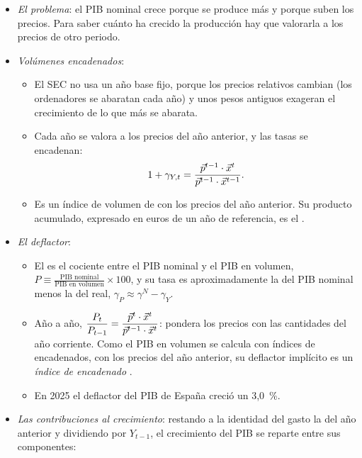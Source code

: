 \documentclass[11pt]{article}
\begin{document}
\begin{itemize}
\item \emph{El problema}: el PIB nominal crece porque se produce más y porque suben los precios. Para saber cuánto ha crecido la producción hay que valorarla a los precios de otro periodo.
\item \emph{Volúmenes encadenados}:
  \begin{itemize}
  \item El SEC no usa un año base fijo, porque los precios relativos cambian (los ordenadores se abaratan cada año) y unos pesos antiguos exageran el crecimiento de lo que más se abarata.
  \item Cada año se valora a los precios del año anterior, y las tasas se encadenan\nocite{SEC2010}:
\begin{equation}\label{eq:volumen-encadenado}
1+\gamma_{Y,t}=\frac{\vec{p}^{t-1}\cdot\vec{x}^{t}}{\vec{p}^{t-1}\cdot\vec{x}^{t-1}} .
\end{equation}
  \item Es un índice de volumen de  con los precios del año anterior. Su producto acumulado, expresado en euros de un año de referencia, es el .
  \end{itemize}
\item \emph{El deflactor}:
  \begin{itemize}
  \item El  es el cociente entre el PIB nominal y el PIB en volumen, $P\equiv\frac{\text{PIB nominal}}{\text{PIB en volumen}}\times100$, y su tasa es aproximadamente la del PIB nominal menos la del real, $\gamma_P\approx\gamma^N-\gamma_Y$.
  \item Año a año, $\dfrac{P_t}{P_{t-1}}=\dfrac{\vec{p}^{t}\cdot\vec{x}^{t}}{\vec{p}^{t-1}\cdot\vec{x}^{t}}$: pondera los precios con las cantidades del año corriente. Como el PIB en volumen se calcula con índices de  encadenados, con los precios del año anterior, su deflactor implícito es un \emph{índice de  encadenado} .
  \item En 2025 el deflactor del PIB de España creció un 3,0~\%\nocite{INE2026CNA2025}.
  \end{itemize}
\item \emph{Las contribuciones al crecimiento}: restando a la identidad del gasto la del año anterior y dividiendo por $Y_{t-1}$, el crecimiento del PIB se reparte entre sus componentes:

\end{itemize}
\end{document}
